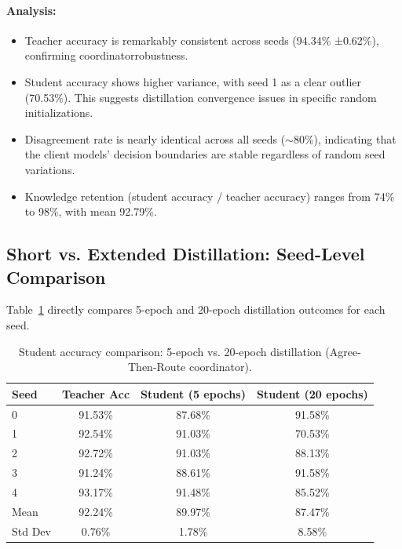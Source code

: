 \documentclass[12pt]{article}
\begin{document}
\paragraph{Analysis:}

\begin{itemize}
    \item Teacher accuracy is remarkably consistent across seeds (94.34\% ±0.62\%), confirming coordinatorrobustness.
    
    \item Student accuracy shows higher variance, with seed 1 as a clear outlier (70.53\%). This suggests distillation convergence issues in specific random initializations.
    
    \item Disagreement rate is nearly identical across all seeds ($\sim$80\%), indicating that the client models' decision boundaries are stable regardless of random seed variations.
    
    \item Knowledge retention (student accuracy / teacher accuracy) ranges from 74\% to 98\%, with mean 92.79\%.
\end{itemize}

\subsection{Short vs. Extended Distillation: Seed-Level Comparison}

Table~\ref{tab:distillation_comparison} directly compares 5-epoch and 20-epoch distillation outcomes for each seed.

\begin{table}[h]
\centering
\caption{Student accuracy comparison: 5-epoch vs. 20-epoch distillation (Agree-Then-Route coordinator).}
\label{tab:distillation_comparison}
\begin{tabular}{lccc}
\toprule
\textbf{Seed} & \textbf{Teacher Acc} & \textbf{Student (5 epochs)} & \textbf{Student (20 epochs)} \\
\midrule
0 & 91.53\% & 87.68\% & 91.58\% \\
1 & 92.54\% & 91.03\% & 70.53\% \\
2 & 92.72\% & 91.03\% & 88.13\% \\
3 & 91.24\% & 88.61\% & 91.58\% \\
4 & 93.17\% & 91.48\% & 85.52\% \\
\midrule
Mean & 92.24\% & 89.97\% & 87.47\% \\
Std Dev & 0.76\% & 1.78\% & 8.58\% \\
\bottomrule
\end{tabular}
\end{table}
\end{document}
